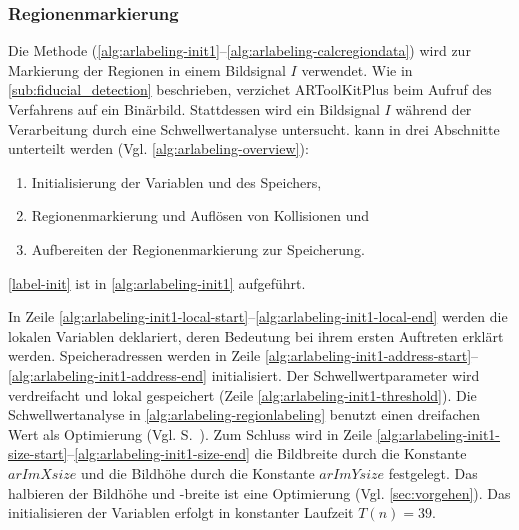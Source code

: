 \subsubsection{Regionenmarkierung} %
\label{sub:regionenmarkierung}

Die Methode  (\autoref{alg:arlabeling-init1}--\autoref{alg:arlabeling-calcregiondata}) wird zur
 Markierung der Regionen in einem Bildsignal $I$ verwendet. Wie in \autoref{sub:fiducial_detection} beschrieben,
 verzichet ARToolKitPlus beim Aufruf des Verfahrens auf ein Binärbild. Stattdessen wird ein Bildsignal $I$ während der
 Verarbeitung durch eine Schwellwertanalyse untersucht.  kann in drei Abschnitte unterteilt werden
 (Vgl. \autoref{alg:arlabeling-overview}):
\begin{enumerate}
	\item Initialisierung der Variablen und des Speichers, \label{label-init}
	\item Regionenmarkierung und Auflösen von Kollisionen und \label{label-region}
	\item Aufbereiten der Regionenmarkierung zur Speicherung. \label{label-cleaning}
\end{enumerate}


\autoref{label-init} ist in \autoref{alg:arlabeling-init1} aufgeführt.

In Zeile \ref{alg:arlabeling-init1-local-start}--\ref{alg:arlabeling-init1-local-end} werden die lokalen Variablen
 deklariert, deren Bedeutung bei ihrem ersten Auftreten erklärt werden. Speicheradressen werden in Zeile
 \ref{alg:arlabeling-init1-address-start}--\ref{alg:arlabeling-init1-address-end} initialisiert. Der
 Schwellwertparameter wird verdreifacht und lokal gespeichert (Zeile \ref{alg:arlabeling-init1-threshold}). Die
 Schwellwertanalyse in \autoref{alg:arlabeling-regionlabeling} benutzt einen dreifachen Wert als Optimierung
 (Vgl. S.~\pageref{sub:arlabel-threshold}). Zum Schluss wird in Zeile
 \ref{alg:arlabeling-init1-size-start}--\ref{alg:arlabeling-init1-size-end} die Bildbreite durch die Konstante
 $\mathit{arImXsize}$ und die Bildhöhe durch die Konstante $\mathit{arImYsize}$ festgelegt. Das halbieren der Bildhöhe
 und -breite ist eine Optimierung (Vgl. \autoref{sec:vorgehen}). Das initialisieren der Variablen erfolgt in konstanter
 Laufzeit $T(n) = 39$.

